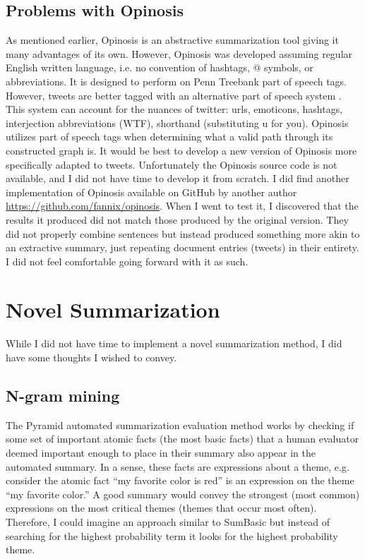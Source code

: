 \documentclass[paper=letter, fontsize=12pt]{article}
\begin{document}
\subsection{Problems with Opinosis} \label{subsec:opproblems}
As mentioned earlier, Opinosis is an abstractive summarization tool giving it many advantages of its own. However, Opinosis was developed assuming regular English written language, i.e. no convention of hashtags, @ symbols, or abbreviations. It is designed to perform on Penn Treebank part of speech tags. However, tweets are better tagged with an alternative part of speech system \cite{Gimpel2011}. This system can account for the nuances of twitter: urls, emoticons, hashtags, interjection abbreviations (WTF), shorthand (substituting u for you). Opinosis utilizes part of speech tags when determining what a valid path through its constructed graph is. It would be best to develop a new version of Opinosis more specifically adapted to tweets. Unfortunately the Opinosis source code is not available, and I did not have time to develop it from scratch. I did find another implementation of Opinosis available on GitHub by another author \url{https://github.com/fannix/opinosis}. When I went to test it, I discovered that the results it produced did not match those produced by the original version. They did not properly combine sentences but instead produced something more akin to an extractive summary, just repeating document entries (tweets) in their entirety. I did not feel comfortable going forward with it as such.

\section{Novel Summarization}
While I did not have time to implement a novel summarization method, I did have some thoughts I wished to convey. 

\subsection{N-gram mining}
The Pyramid automated summarization evaluation method \cite{Nenkova2004} works by checking if some set of important atomic facts (the most basic facts) that a human evaluator deemed important enough to place in their summary also appear in the automated summary. In a sense, these facts are expressions about a theme, e.g. consider the atomic fact ``my favorite color is red'' is an expression on the theme ``my favorite color.'' A good summary would convey the strongest (most common) expressions on the most critical themes (themes that occur most often).  Therefore, I could imagine an approach similar to SumBasic but instead of searching for the highest probability term it looks for the highest probability theme.
\end{document}
